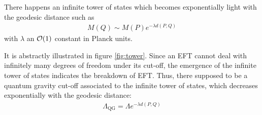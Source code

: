 \begin{tcolorbox}[title=Swampland Distance Conjecture,
    title filled=false,
    colback=blue!5!white,
    colframe=blue!75!black]
    There happens an infinite tower of states which becomes exponentially light with the geodesic distance such as 
    \begin{align}
        M(Q) \sim M(P) e^{-\lambda d(P,Q)}
    \end{align}
    with $\lambda$ an $\order*{1}$ constant in Planck units. 
\end{tcolorbox}
It is abstractly illustrated in figure \ref{fig:tower}. Since an EFT cannot deal with infinitely many degrees of freedom under its cut-off, the emergence of the infinite tower of states indicates the breakdown of EFT. Thus, there supposed to be a quantum gravity cut-off associated to the infinite tower of states, which decreases exponentially with the geodesic distance:
\begin{align}
    \Lambda _{\text{QG}} = \Lambda e^{-\lambda d(P,Q)}
\end{align}
